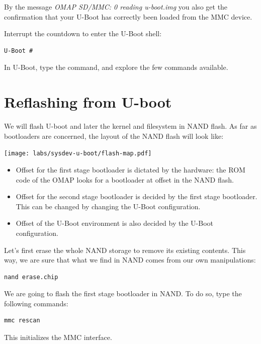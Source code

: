 By the message {\em OMAP SD/MMC: 0
reading u-boot.img} you also get the
confirmation that your U-Boot has correctly been loaded from the MMC
device.

Interrupt the countdown to enter the U-Boot shell:
\begin{verbatim}
U-Boot #
\end{verbatim}

In U-Boot, type the  command, and explore the few commands available.

\section{Reflashing from U-boot}

We will flash U-boot and later the kernel and filesystem in NAND
flash. As far as bootloaders are concerned, the layout of the NAND
flash will look like:

\begin{center}
  \texttt{[image: labs/sysdev-u-boot/flash-map.pdf]}
\end{center}

\begin{itemize}
\item Offset  for the first stage bootloader is dictated by
  the hardware: the ROM code of the OMAP looks for a bootloader at
  offset  in the NAND flash.
\item Offset  for the second stage bootloader is decided
  by the first stage bootloader. This can be changed by changing the
  U-Boot configuration.
\item Offset  of the U-Boot environment is also decided
  by the U-Boot configuration.
\end{itemize}

Let's first erase the whole NAND storage to remove its existing
contents. This way, we are sure that what we find in NAND comes from
our own manipulations:

\begin{verbatim}
nand erase.chip
\end{verbatim}

We are going to flash the first stage bootloader in NAND. To do so,
type the following commands:

\begin{verbatim}
mmc rescan
\end{verbatim}

This initializes the MMC interface.

